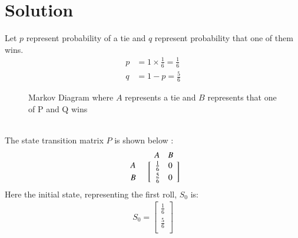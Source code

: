 \documentclass[journal,12pt,twocolumn]{IEEEtran}
\begin{document}
\section*{Solution}
Let $p$ represent probability of a tie and $q$ represent probability that one of them wins. 
\begin{align}
    p &= 1\times\frac{1}{6} = \frac{1}{6}\\
    q &= 1-p = \frac{5}{6}
\end{align}
\vspace{-5mm}
\begin{figure}[h]
    \centering
    \par{Markov Diagram where $A$ represents a tie and $B$ represents that one of P and Q wins}
\end{figure}\vspace{3mm}\\
The state transition matrix $P$ is shown below :
\begin{align*}
\begin{array}{c c} &
\begin{array}{c c} A  & B \\
\end{array}
\\
\begin{array}{c c}
A \\[3pt]
B
\end{array}
&
\left[
\begin{array}{c c}
\frac{1}{6} & 0 \\[2pt]
\frac{5}{6} & 0 \\
\end{array}
\right]
\end{array}
\end{align*}
Here the initial state, representing the first roll, $S_0$ is:\\
\begin{align*}
    S_0 = 
    \left[
\begin{array}{c}
\frac{1}{6} \\[3pt]
\frac{5}{6} \\
\end{array}
\right]
\end{align*}
\end{document}

